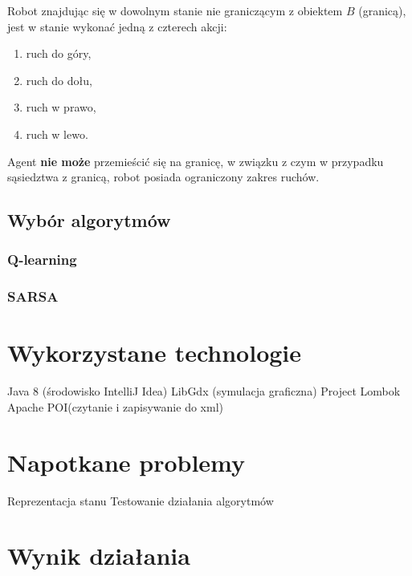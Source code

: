 Robot znajdując się w dowolnym stanie nie graniczącym z obiektem $B$ (granicą), jest w stanie wykonać jedną z czterech 
akcji:

\begin{enumerate}
 \item ruch do góry,
 \item ruch do dołu,
 \item ruch w prawo,
 \item ruch w lewo.
\end{enumerate}

Agent \textbf{nie może} przemieścić się na granicę, w związku z czym w przypadku sąsiedztwa z granicą, robot posiada 
ograniczony zakres ruchów. 

\subsection{Wybór algorytmów}
\label{subsec:wyboralgorytmow}



\subsubsection{Q-learning}
\label{subsubsec:qlearning}

\subsubsection{SARSA}
\label{subsubsec:sarsa}

\section{Wykorzystane technologie}
\label{sec:wykorzystanetechnologie}

Java 8 (środowisko IntelliJ Idea)
LibGdx (symulacja graficzna)
Project Lombok
Apache POI(czytanie i zapisywanie do xml)


\section{Napotkane problemy}
\label{sec:napotkaneproblemy}

Reprezentacja stanu
Testowanie działania algorytmów

\section{Wynik działania}
\label{sec:wynikdzialania}
















